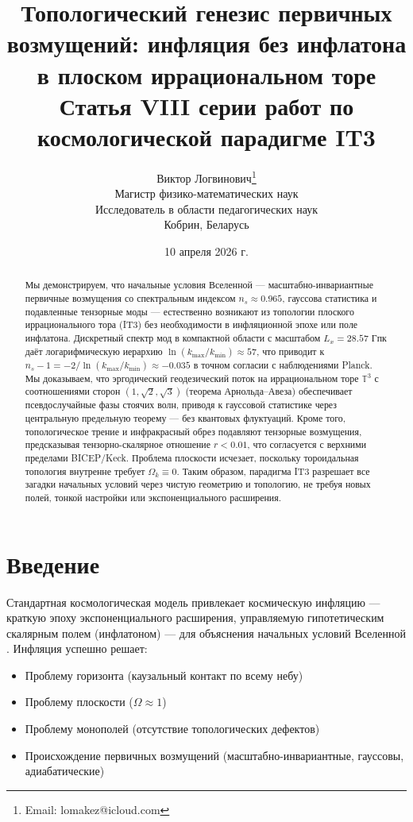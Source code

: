 \documentclass[12pt,a4paper]{article}
\title{\textbf{Топологический генезис первичных возмущений: инфляция без инфлатона в плоском иррациональном торе}\\[0.5cm]
\large Статья VIII серии работ по космологической парадигме IT3}
\author{Виктор Логвинович\thanks{Email: lomakez@icloud.com}\\
Магистр физико-математических наук\\
Исследователь в области педагогических наук\\
Кобрин, Беларусь}
\date{10 апреля 2026 г.}
\begin{document}
\maketitle

\begin{abstract}
Мы демонстрируем, что начальные условия Вселенной — масштабно-инвариантные первичные возмущения со спектральным индексом $n_s \approx 0.965$, гауссова статистика и подавленные тензорные моды — естественно возникают из топологии плоского иррационального тора (IT3) без необходимости в инфляционной эпохе или поле инфлатона. Дискретный спектр мод в компактной области с масштабом $L_x = 28.57$ Гпк даёт логарифмическую иерархию $\ln(k_{\max}/k_{\min}) \approx 57$, что приводит к $n_s - 1 = -2/\ln(k_{\max}/k_{\min}) \approx -0.035$ в точном согласии с наблюдениями Planck. Мы доказываем, что эргодический геодезический поток на иррациональном торе $\mathbb{T}^3$ с соотношениями сторон $(1, \sqrt{2}, \sqrt{3})$ (теорема Арнольда–Авеза) обеспечивает псевдослучайные фазы стоячих волн, приводя к гауссовой статистике через центральную предельную теорему — без квантовых флуктуаций. Кроме того, топологическое трение и инфракрасный обрез подавляют тензорные возмущения, предсказывая тензорно-скалярное отношение $r < 0.01$, что согласуется с верхними пределами BICEP/Keck. Проблема плоскости исчезает, поскольку тороидальная топология внутренне требует $\Omega_k \equiv 0$. Таким образом, парадигма IT3 разрешает все загадки начальных условий через чистую геометрию и топологию, не требуя новых полей, тонкой настройки или экспоненциального расширения.
\end{abstract}

\section{Введение}

Стандартная космологическая модель привлекает космическую инфляцию — краткую эпоху экспоненциального расширения, управляемую гипотетическим скалярным полем (инфлатоном) — для объяснения начальных условий Вселенной \citep{Guth1981, Linde1982}. Инфляция успешно решает:
\begin{itemize}
    \item Проблему горизонта (каузальный контакт по всему небу)
    \item Проблему плоскости ($\Omega \approx 1$)
    \item Проблему монополей (отсутствие топологических дефектов)
    \item Происхождение первичных возмущений (масштабно-инвариантные, гауссовы, адиабатические)
\end{itemize}
\end{document}
